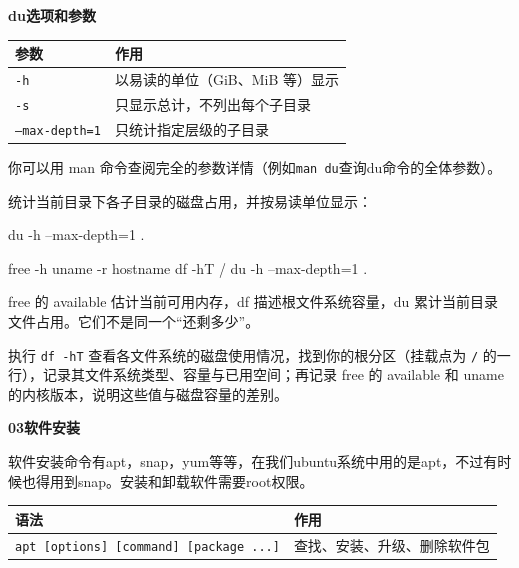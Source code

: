 \begin{table}[H]\centering
\textbf{du\enspace 选项和参数}

	\begin{tabular}{p{}p{}}
		\toprule[1.5pt]
		参数 & 作用\\
		\midrule[1pt]
		\texttt{-h}		&以易读的单位（GiB、MiB 等）显示\\
		\texttt{-s}		&只显示总计，不列出每个子目录\\
		\texttt{--max-depth=1}		&只统计指定层级的子目录\\
		\bottomrule[1.5pt]
	\end{tabular}
\end{table}


你可以用 man 命令查阅完全的参数详情（例如\texttt{man du}查询du命令的全体参数）。

\begin{example}
统计当前目录下各子目录的磁盘占用，并按易读单位显示：


\begin{tbash}
du -h --max-depth=1 .
\end{tbash}


\end{example}

\begin{example}


\begin{tbash}
free -h
uname -r
hostname
df -hT /
du -h --max-depth=1 .
\end{tbash}


free 的 available 估计当前可用内存，df 描述根文件系统容量，du 累计当前目录文件占用。它们不是同一个“还剩多少”。
\end{example}
\begin{exercise}\label{ex:v1-disk-space}
执行 \texttt{df -hT} 查看各文件系统的磁盘使用情况，找到你的根分区（挂载点为 \texttt{/} 的一行），记录其文件系统类型、容量与已用空间；再记录 free 的 available 和 uname 的内核版本，说明这些值与磁盘容量的差别。
\end{exercise}

\textbf{03软件安装}

软件安装命令有apt，snap，yum等等，在我们ubuntu系统中用的是apt，不过有时候也得用到snap。安装和卸载软件需要root权限。

\begin{table}[!htbp]
	\centering
	\begin{tabular}{p{}p{}}
		\toprule[1.5pt]
		语法 & 作用\\
		\midrule[1pt]
		\texttt{apt  [options]   [command]   [package ...]}		&查找、安装、升级、删除软件包\\
		\bottomrule[1.5pt]
	\end{tabular}
\end{table}

